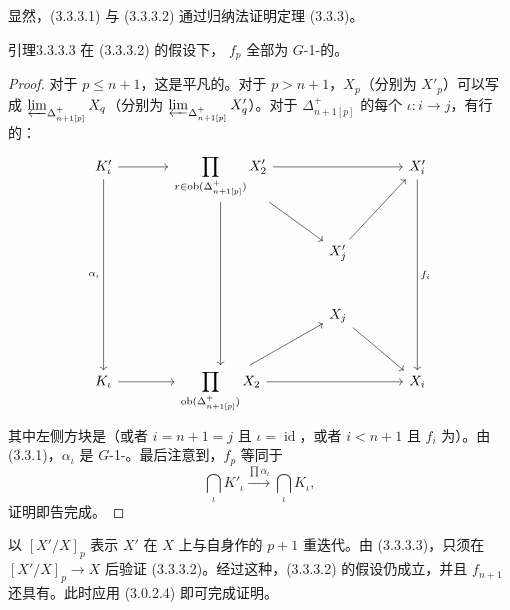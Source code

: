 显然，(3.3.3.1) 与 (3.3.3.2) 通过归纳法证明定理 (3.3.3)。
\begin{SGAresult}{引理}{3.3.3.3}
在 (3.3.3.2) 的假设下， $f_p$ 全部为 $G$-1-的。
\end{SGAresult}
\begin{proof}
对于 $p\leq n+1$，这是平凡的。对于 $p>n+1$，$X_p$（分别为 $X'_p$）可以写成 $\varprojlim_{\Delta^+_{n+1[p]}}X_q$（分别为 $\varprojlim_{\Delta^+_{n+1[p]}}X'_q$）。对于 $\Delta^+_{n+1[p]}$ 的每个 $\iota:i\to j$，有行的：
\[
\begin{tikzcd}[column sep=large,row sep=large]
K'_\iota\arrow[r]\arrow[ddd,"\alpha_\iota"']&
\displaystyle\prod_{r\in\operatorname{ob}(\Delta^+_{n+1[p]})}X'_2
\arrow[rr]\arrow[dr]\arrow[ddd]&&X'_i\arrow[ddd,"f_i"]\\
&&X'_j\arrow[ur]&\\
&&X_j\arrow[dr]&\\
K_\iota\arrow[r]&
\displaystyle\prod_{\operatorname{ob}(\Delta^+_{n+1[p]})}X_2
\arrow[rr]\arrow[ur]&&X_i
\end{tikzcd}
\]
其中左侧方块是（或者 $i=n+1=j$ 且 $\iota=\operatorname{id}$，或者 $i<n+1$ 且 $f_i$ 为）。由 (3.3.1)，$\alpha_\iota$ 是 $G$-1-。最后注意到，$f_p$ 等同于
\[
\bigcap_\iota K'_\iota\xrightarrow{\prod\alpha_\iota}\bigcap_\iota K_\iota,
\]
证明即告完成。
\end{proof}
以 $[X'/X]_p$ 表示 $X'$ 在 $X$ 上与自身作的 $p+1$ 重迭代。由 (3.3.3.3)，只须在 $[X'/X]_p\to X$ 后验证 (3.3.3.2)。经过这种，(3.3.3.2) 的假设仍成立，并且 $f_{n+1}$ 还具有。此时应用 (3.0.2.4) 即可完成证明。

